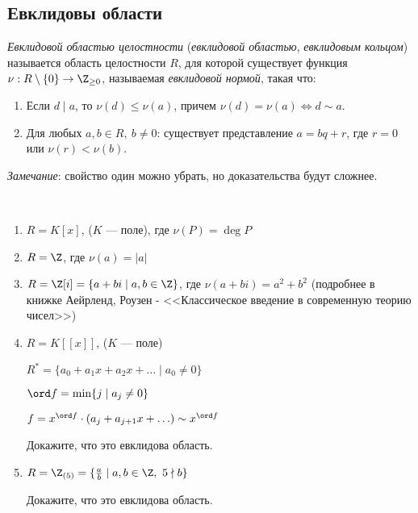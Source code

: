 \subsection{Евклидовы области}

\begin{defn}
    \emph{Евклидовой областью целостности} (\emph{евклидовой областью}, \emph{евклидовым кольцом}) называется область целостности $R$, 
    для которой существует функция $\nu: R \setminus \{0\} \to \Z_{\geq 0}$, называемая \emph{евклидовой нормой}, такая что:

    \begin{enumerate}
        \item Если $d \mid a$, то $\nu(d) \leq \nu(a)$, причем $\nu(d) = \nu(a) \iff d \sim a$.
        \item Для любых $a, b \in R,~b \neq 0$: существует представление $a = bq + r$, где $r = 0$ или $\nu(r) < \nu(b)$.
    \end{enumerate}

    \emph{Замечание}: свойство один можно убрать, но доказательства будут сложнее.
\end{defn}

\begin{examples}~

    \begin{enumerate}
        \item $R = K[x]$, ($K$ --- поле), где $\nu(P) = \deg P$

        \item $R = \Z$, где $\nu(a) = |a|$
        
        \item $R = \Z[i] = \{ a + bi \mid a,b \in \Z \}$, где $\nu(a + bi) = a^2 + b^2$ 
        (подробнее в книжке Аейрленд, Роузен - <<Классическое введение в современную теорию чисел>>)
        
        \item $R = K[[x]]$, ($K$ --- поле)
        
        $R^* = \{ a_0 + a_1 x + a_2 x + \ldots \mid a_0 \neq 0 \}$

        $\ord f =  \min \{ j \mid a_j \neq 0 \}$

        $f = x^{\ord f} \cdot (a_j + a_{j + 1}x + \ldots) \sim x^{\ord f}$ 

        \begin{exerc}
            Докажите, что это евклидова область.
        \end{exerc}

        \item $R = \Z_{(5)} = \{ \frac{a}{b} \mid a, b \in \Z,~5 \nmid b \}$
        
        \begin{exerc}
            Докажите, что это евклидова область.
        \end{exerc}
    \end{enumerate}
\end{examples}

